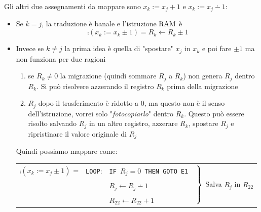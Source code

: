Gli altri due assegnamenti da mappare sono $x_k:= x_j+1$ e $x_k := x_j \dotminus 1$:
\begin{itemize}
	\item Se $k=j$, la traduzione è banale e l'istruzione $\text{RAM}$ è
	$$ \comp(x_k := x_k \pm 1) = R_k \leftarrow R_k \pm 1 $$ \vspace{-0.75cm}
	\item Invece se $k \neq j$ la prima idea è quella di "spostare" $x_j$ in $x_k$ e poi fare $\pm 1$ ma non funziona per due ragioni
	\begin{enumerate}
		\item se $R_k \neq 0$ la migrazione (quindi sommare $R_j$ a $R_k$) non genera $R_j$ dentro $R_k$. Si può risolvere azzerando il registro $R_k$ prima della migrazione
		\item $R_j$ dopo il trasferimento è ridotto a 0, ma questo non è il senso dell'istruzione, vorrei solo "\textit{fotocopiarlo}" dentro $R_k$. Questo può essere risolto salvando $R_j$ in un altro registro, azzerare $R_k$, spostare $R_j$ e ripristinare il valore originale di $R_j$
	\end{enumerate}
	Quindi possiamo mappare come:
	\begin{center}
		\renewcommand{\arraystretch}{1.25}
		\begin{tabular}{l|r l|l}\cline{2-3}
			$\comp (x_k := x_j \pm 1)$ = & \texttt{LOOP}:& \texttt{IF $R_j = 0$ THEN GOTO E1}
			&\multirow{4}{*}{\hspace{-.2cm}
				$\begin{rcases}
					\phantom{}\\
					\phantom{}\\
					\phantom{}\\
					\phantom{}\\
				\end{rcases}$ Salva $R_j$ in $R_{22}$
			} \\
			&& $R_j\leftarrow R_j \dotminus 1$ & \\
			&& $R_{22} \leftarrow R_{22} + 1$ & \\

\end{tabular}
\end{center}
\end{itemize}
